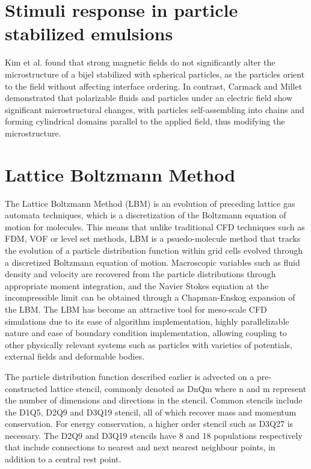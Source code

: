 \section{Stimuli response in particle stabilized emulsions}

Kim et al. found that strong magnetic fields do not significantly alter the microstructure of a bijel stabilized with spherical particles, as the particles orient 
to the field without affecting interface ordering. \cite{kim_bijels_2010} In contrast, Carmack and Millet demonstrated that polarizable fluids and particles under 
an electric field show significant microstructural changes, with particles self-assembling into chains and forming cylindrical domains parallel to the applied field, 
thus modifying the microstructure. \cite{carmack_tuning_2018}

\section{Lattice Boltzmann Method}

The Lattice Boltzmann Method (LBM) is an evolution of preceding lattice gas automata techniques, which is a discretization of the Boltzmann equation of motion for 
molecules. This means that unlike traditional CFD techniques such as FDM, VOF or level set methods, LBM is a psuedo-molecule method that tracks the evolution of a 
particle distribution function within grid cells evolved through a discretized Boltzmann equation of motion. Macroscopic variables such as fluid density and 
velocity are recovered from the particle distributions through appropriate moment integration, and the Navier Stokes equation at the incompressible limit can be 
obtained through a Chapman-Enskog expansion of the LBM. The LBM has become an attractive tool for meso-scale CFD simulations due to its ease of algorithm 
implementation, highly parallelizable nature and ease of boundary condition implementation, allowing coupling to other physically relevant systems such as 
particles with varieties of potentials, external fields and deformable bodies.

The particle distribution function described earlier is advected on a pre-constructed lattice stencil, commonly denoted as DnQm where n and m represent the 
number of dimensions and directions in the stencil. Common stencils include the D1Q5, D2Q9 and D3Q19 stencil, all of which recover mass and momentum conservation. 
For energy conservation, a higher order stencil such as D3Q27 is necessary. The D2Q9 and D3Q19 stencils have 8 and 18 populations respectively that include 
connections to nearest and next nearest neighbour points, in addition to a central rest point. 

